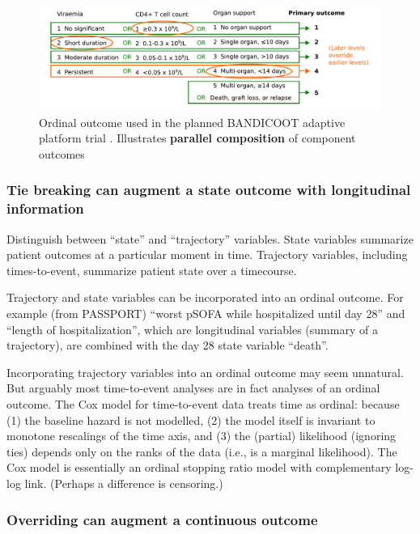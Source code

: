 \documentclass[
  11pt,
  fleqn
]{article}
\begin{document}
\begin{figure}
  \includegraphics[width=7in]{parallel_composition_bandicoot.pdf}
  \caption{Ordinal outcome used in the planned BANDICOOT adaptive
    platform trial \citep{walkerCodesigningNovelOrdinal2025}.
  Illustrates \textbf{parallel composition} of component outcomes}
  \label{fig:parallel_bandicoot}
\end{figure}

\subsubsection{Tie breaking can augment a state outcome with longitudinal
information}

Distinguish between ``state'' and ``trajectory'' variables. State
variables summarize patient outcomes at a particular moment in time.
Trajectory variables, including times-to-event, summarize patient
state over a timecourse.

Trajectory and state variables can be incorporated into an ordinal outcome. For
example (from PASSPORT) ``worst pSOFA while hospitalized until day 28'' and
``length of hospitalization'', which are longitudinal variables (summary of a
trajectory), are combined with the day 28 state variable ``death''.

Incorporating trajectory variables into an ordinal outcome may seem unnatural.
But arguably most time-to-event analyses are in fact analyses of an
ordinal outcome. The Cox model for time-to-event data treats time as ordinal:
because (1) the baseline hazard is not modelled, (2) the model itself is
invariant to monotone rescalings of the time axis, and (3) the (partial)
likelihood (ignoring ties) depends only on the ranks of the data (i.e., is a
marginal likelihood). The Cox model is essentially an ordinal
stopping ratio model with complementary log-log link. (Perhaps a
difference is censoring.)

\subsubsection{Overriding can augment a continuous outcome}
\end{document}
